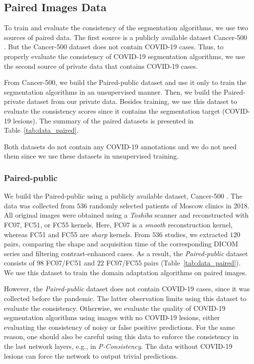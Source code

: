 \subsection{Paired Images Data}

To train and evaluate the consistency of the segmentation algorithms, we use two sources of paired data. The first source is a publicly available dataset Cancer-500 \cite{morozov2021simplified}. But the Cancer-500 dataset does not contain COVID-19 cases. Thus, to properly evaluate the consistency of COVID-19 segmentation algorithms, we use the second source of private data that contains COVID-19 cases. 

From Cancer-500, we build the Paired-public dataset and use it only to train the segmentation algorithms in an unsupervised manner. Then, we build the Paired-private dataset from our private data. Besides training, we use this dataset to evaluate the consistency scores since it contains the segmentation target (COVID-19 lesions). The summary of the paired datasets is presented in Table~\ref{tab:data_paired}.



Both datasets do not contain any COVID-19 annotations and we do not need them since we use these datasets in unsupervised training.


\subsubsection{Paired-public}

We build the Paired-public using a publicly available dataset, Cancer-500 \cite{morozov2021simplified}. The data was collected from $536$ randomly selected patients of Moscow clinics in 2018. All original images were obtained using a \textit{Toshiba} scanner and reconstructed with FC07, FC51, or FC55 kernels. Here, FC07 is a \textit{smooth} reconstruction kernel, whereas FC51 and FC55 are \textit{sharp} kernels. From $536$ studies, we extracted $120$ pairs, comparing the shape and acquisition time of the corresponding DICOM series and filtering contrast-enhanced cases. As a result, the \textit{Paired-public} dataset consists of $98$ FC07/FC51 and $22$ FC07/FC55 pairs (Table~\ref{tab:data_paired}). We use this dataset to train the domain adaptation algorithms on paired images. %

However, the \textit{Paired-public} dataset does not contain COVID-19 cases, since it was collected before the pandemic. The latter observation limits using this dataset to evaluate the consistency. Otherwise, we evaluate the quality of COVID-19 segmentation algorithms using images with no COVID-19 lesions, either evaluating the consistency of noisy or false positive predictions. For the same reason, one should also be careful using this data to enforce the consistency in the last network layers, e.g., in \textit{P-Consistency}. The data without COVID-19 lesions can force the network to output trivial predictions.

